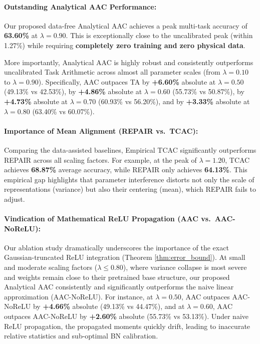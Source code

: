 \documentclass{article}
\theoremstyle{plain}
\theoremstyle{definition}
\theoremstyle{remark}
\begin{document}
\paragraph{Outstanding Analytical AAC Performance:}
Our proposed data-free Analytical AAC achieves a peak multi-task accuracy of \textbf{63.60\%} at $\lambda = 0.90$. This is exceptionally close to the uncalibrated peak (within 1.27\%) while requiring \textbf{completely zero training and zero physical data}.

More importantly, Analytical AAC is highly robust and consistently outperforms uncalibrated Task Arithmetic across almost all parameter scales (from $\lambda = 0.10$ to $\lambda = 0.90$). Specifically, AAC outpaces TA by \textbf{+6.60\%} absolute at $\lambda = 0.50$ (49.13\% vs 42.53\%), by \textbf{+4.86\%} absolute at $\lambda = 0.60$ (55.73\% vs 50.87\%), by \textbf{+4.73\%} absolute at $\lambda = 0.70$ (60.93\% vs 56.20\%), and by \textbf{+3.33\%} absolute at $\lambda = 0.80$ (63.40\% vs 60.07\%).

\paragraph{Importance of Mean Alignment (REPAIR vs.\ TCAC):}
Comparing the data-assisted baselines, Empirical TCAC significantly outperforms REPAIR across all scaling factors. For example, at the peak of $\lambda = 1.20$, TCAC achieves \textbf{68.87\%} average accuracy, while REPAIR only achieves \textbf{64.13\%}. This empirical gap highlights that parameter interference distorts not only the scale of representations (variance) but also their centering (mean), which REPAIR fails to adjust.

\paragraph{Vindication of Mathematical ReLU Propagation (AAC vs.\ AAC-NoReLU):}
Our ablation study dramatically underscores the importance of the exact Gaussian-truncated ReLU integration (Theorem \ref{thm:error_bound}). At small and moderate scaling factors ($\lambda \le 0.80$), where variance collapse is most severe and weights remain close to their pretrained base structure, our proposed Analytical AAC consistently and significantly outperforms the naive linear approximation (AAC-NoReLU). For instance, at $\lambda = 0.50$, AAC outpaces AAC-NoReLU by \textbf{+4.66\%} absolute (49.13\% vs 44.47\%), and at $\lambda = 0.60$, AAC outpaces AAC-NoReLU by \textbf{+2.60\%} absolute (55.73\% vs 53.13\%). Under naive ReLU propagation, the propagated moments quickly drift, leading to inaccurate relative statistics and sub-optimal BN calibration. 
\end{document}
